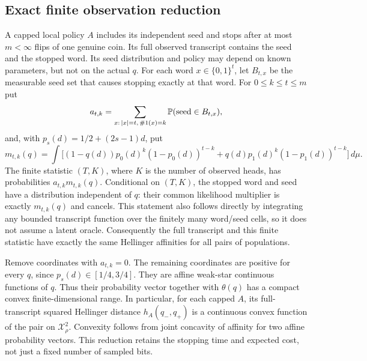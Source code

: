\subsection*{Exact finite observation reduction}
A capped local policy $A$ includes its independent seed and stops after at
most $m<\infty$ flips of one genuine coin. Its full observed transcript
contains the seed and the stopped word. Its seed distribution and policy
may depend on known parameters, but not on the actual $q$.
For each word $x\in\{0,1\}^t$, let $B_{t,x}$ be the measurable seed set
that causes stopping exactly at that word. For $0\le k\le t\le m$ put
\[
 a_{t,k}=\sum_{x:\,|x|=t,\,\#1(x)=k}\mathbb P(\text{seed}\in B_{t,x}),
\]
and, with $p_s(d)=1/2+(2s-1)d$, put
\[
 m_{t,k}(q)=\int\big[(1-q(d))p_0(d)^k(1-p_0(d))^{t-k}
                  +q(d)p_1(d)^k(1-p_1(d))^{t-k}\big]\,d\mu.
\]
The finite statistic $(T,K)$, where $K$ is the number of observed heads,
has probabilities $a_{t,k}m_{t,k}(q)$. Conditional on $(T,K)$, the stopped
word and seed have a distribution independent of $q$: their common
likelihood multiplier is exactly $m_{t,k}(q)$ and cancels. This statement
also follows directly by integrating any bounded transcript function over
the finitely many word/seed cells, so it does not assume a latent oracle.
Consequently the full transcript and this finite statistic have exactly
the same Hellinger affinities for all pairs of populations.

Remove coordinates with $a_{t,k}=0$. The remaining coordinates are positive
for every $q$, since $p_s(d)\in[1/4,3/4]$. They are affine weak-star
continuous functions of $q$. Thus their probability vector together with
$\theta(q)$ has a compact convex finite-dimensional range. In particular,
for each capped $A$, its full-transcript squared Hellinger distance
$h_A(q_-,q_+)$ is a continuous convex function of the pair on
$\mathcal X_\rho^2$. Convexity follows from joint concavity of affinity for
two affine probability vectors. This reduction retains the stopping time
and expected cost, not just a fixed number of sampled bits.

